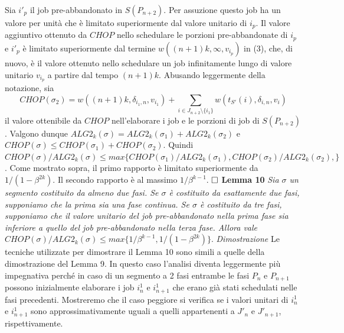 \documentclass[twoside,openany,titlepage,fleqn,
	headinclude,12pt,a4paper,BCOR5mm,footinclude]{scrbook}
\begin{document}
Sia $i'_{p}$ il job pre-abbandonato in $S(P_{n+2})$. Per assuzione questo job ha un valore per unità che è limitato superiormente dal valore unitario di $i_{p}$. Il valore aggiuntivo ottenuto da $CHOP$ nello schedulare le porzioni pre-abbandonate di $i_{p}$ e $i'_{p}$ è limitato superiormente dal termine $w ((n + 1) k, \infty, v_{i_{p}})$ in (3), che, di nuovo, è il valore ottenuto nello schedulare un job infinitamente lungo di valore unitario $v_{i_{p}}$ a partire dal tempo $(n + 1) k$. Abusando leggermente della notazione, sia
$$CHOP(\sigma_{2}) = w ((n + 1) k, \delta_{i_{1}, n}, v_{i_{1}}) + \sum_{i \in J_{n+2} \setminus \{i_{1}\}} w (t_{S'}(i), \delta_{i, n}, v_{i})$$ 
il valore ottenibile da $CHOP$ nell'elaborare i job e le porzioni di job di $S(P_{n+2})$. Valgono dunque $ALG2_{k} (\sigma) = ALG2_{k} (\sigma_{1}) + ALG2_{k} (\sigma_{2})$ e $CHOP(\sigma) \leq CHOP (\sigma_{1}) + CHOP (\sigma_{2})$. Quindi $CHOP (\sigma) / ALG2_{k} (\sigma) \leq max \{CHOP(\sigma_{1}) / ALG2_{k}(\sigma_{1}), CHOP(\sigma_{2}) / ALG2_{k}(\sigma_{2}),\}$. Come mostrato sopra, il primo rapporto è limitato superiormente da $1 / (1 - \beta^{2k})$. Il secondo rapporto è al massimo $1 / \beta^{k - 1}$. $\hfill \square$
\newline \newline
\textbf{Lemma 10}
\textit{Sia $\sigma$ un segmento costituito da almeno due fasi. Se $\sigma$ è costituito da esattamente due fasi, supponiamo che la prima sia una fase continua. Se $\sigma$ è costituito da tre fasi, supponiamo che il valore unitario del job pre-abbandonato nella prima fase sia inferiore a quello del job pre-abbandonato nella terza fase. Allora vale $CHOP(\sigma) / ALG2_{k}(\sigma) \leq max \{1 / \beta^{k-1}, 1 / (1 - \beta^{2k})\}.$}
\newline \newline
\textit{Dimostrazione}
Le tecniche utilizzate per dimostrare il Lemma 10 sono simili a quelle della dimostrazione del Lemma 9. In questo caso l'analisi diventa leggermente più impegnativa perché in caso di un segmento a 2 fasi entrambe le fasi $P_{n}$ e $P_{n + 1}$ possono inizialmente elaborare i job $i_{n}^{1}$ e $i_{n+1}^{1}$ che erano già stati schedulati nelle fasi precedenti. Mostreremo che il caso peggiore si verifica se i valori unitari di $i_{n}^{1}$ e $i_{n+1}^{1}$ sono approssimativamente uguali a quelli appartenenti a $J'_{n}$ e $J'_{n+1}$, rispettivamente. 
\end{document}
